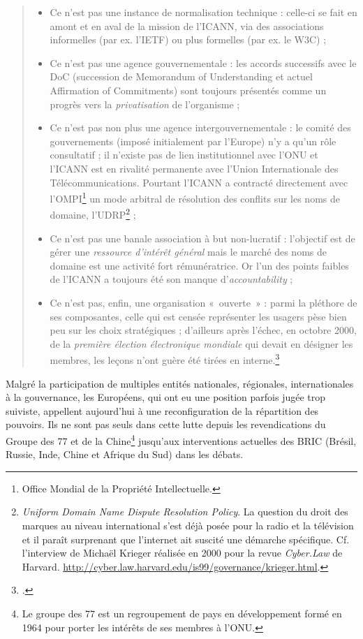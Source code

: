 \documentclass{FramateX}
\begin{document}
\begin{refsection}
\begin{quote}
\begin{itemize}
\item Ce n'est pas une instance de normalisation
technique : celle-ci se fait en amont et en aval de la mission de
l'ICANN, via des associations informelles (par ex.
l'IETF) ou plus formelles (par ex. le W3C) ;
\item Ce n'est pas une agence gouvernementale : les
accords successifs avec le DoC (succession de Memorandum of
Understanding et actuel Affirmation of Commitments) sont toujours
présentés comme un progrès vers la
\textit{privatisation} de
l'organisme ;
\item Ce n'est pas non plus une agence
intergouvernementale : le comité des gouvernements (imposé initialement
par l'Europe) n'y a
qu'un rôle consultatif ; il n'existe
pas de lien institutionnel avec l'ONU et
l'ICANN est en rivalité permanente avec
l'Union Internationale des Télécommunications.
Pourtant l'ICANN a contracté directement avec
l'OMPI\footnote{Office Mondial de la Propriété
Intellectuelle.} un mode arbitral de résolution des conflits sur les
noms de domaine, l'UDRP\footnote{\textit{Uniform
Domain Name Dispute Resolution Policy}. La question du droit des
marques au niveau international s'est déjà posée pour
la radio et la télévision et il paraît surprenant que
l'internet ait suscité une démarche spécifique. Cf.
l'interview de Michaël Krieger réalisée en 2000 pour
la revue \textit{Cyber.Law} de Harvard. \url{http://cyber.law.harvard.edu/is99/governance/krieger.html}.} ;
\item Ce n'est pas une banale association à but
non-lucratif : l'objectif est de gérer une \textit{ressource
d'intérêt général} mais le marché des noms de domaine
est une activité fort rémunératrice. Or l'un des
points faibles de l'ICANN a toujours été son manque
d'\textit{accountability} ;
\item Ce n'est pas, enfin, une organisation «~ouverte~»
: parmi la pléthore de ses composantes, celle qui est censée
représenter les usagers pèse bien peu sur les choix stratégiques ;
d'ailleurs après l'échec, en octobre
2000, de la \textit{première élection électronique mondiale} qui devait en
désigner les membres, les leçons n'ont guère été
tirées en interne.\footnote{\cite[p.~34]{massit-folleagouvernance2012}.}
\end{itemize}
\end{quote}

Malgré la participation de multiples entités nationales, régionales,
internationales à la gouvernance, les Européens, qui ont eu une
position parfois jugée trop suiviste, appellent
aujourd'hui à une reconfiguration de la répartition
des pouvoirs. Ils ne sont pas seuls dans cette lutte depuis les
revendications du Groupe des 77 et de la Chine\footnote{Le groupe des
77 est un regroupement de pays en développement formé en 1964 pour
porter les intérêts de ses membres à l'ONU. }
jusqu'aux interventions actuelles des BRIC (Brésil,
Russie, Inde, Chine et Afrique du Sud) dans les débats.


\end{refsection}
\end{document}
